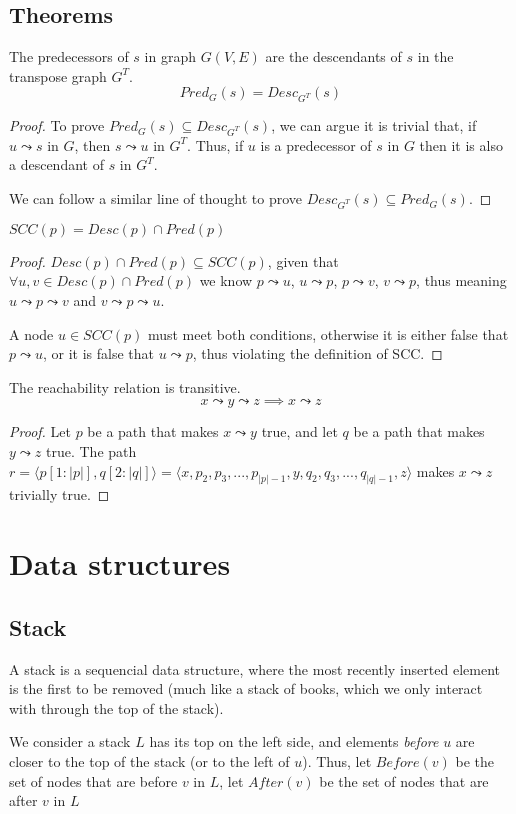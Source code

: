 \subsection{Theorems}
\begin{theorem} \label{theor:pred-desc}
    The predecessors of $s$ in graph $G(V,E)$ are the descendants of $s$ in the transpose graph $G^T$.
    \begin{equation*}
        Pred_{G}(s)=Desc_{G^T}(s)
    \end{equation*}
\end{theorem}
\begin{proof}
    To prove $Pred_G(s) \subseteq Desc_{G^T}(s)$, we can argue it is trivial that, if $u \leadsto s$ in $G$, then $s \leadsto u$ in $G^T$. Thus, if $u$ is a predecessor of $s$ in $G$ then it is also a descendant of $s$ in $G^T$.\par
    We can follow a similar line of thought to prove $Desc_{G^T}(s) \subseteq Pred_G(s)$.
\end{proof}
\begin{theorem} \label{teor:scc}
    $SCC(p)=Desc(p) \cap Pred(p)$
\end{theorem}
\begin{proof}
    $Desc(p) \cap Pred(p) \subseteq SCC(p)$, given that $\forall u, v \in Desc(p) \cap Pred(p)$ we know $p \leadsto u$, $u \leadsto p$, $p \leadsto v$, $v \leadsto p$, thus meaning $u \leadsto p \leadsto v$ and $v \leadsto p \leadsto u$.\par
    A node $u \in SCC(p)$ must meet both conditions, otherwise it is either false that $p \leadsto u$, or it is false that $u \leadsto p$, thus violating the definition of \acrshort{SCC}.
\end{proof}
\begin{theorem}
    The reachability relation is transitive.
    \begin{equation*}
        x \leadsto y \leadsto z \implies x \leadsto z
    \end{equation*}
\end{theorem}
\begin{proof}
Let $p$ be a path that makes $x \leadsto y$ true, and let $q$ be a path that makes $y \leadsto z$ true. The path $r = \langle p[1:|p|], q[2:|q|] \rangle = \langle x, p_2, p_3,...,p_{|p|-1},y,q_2,q_3,...,q_{|q|-1}, z \rangle$ makes $x \leadsto z$ trivially true.
\end{proof}
\section{Data structures}
\subsection{Stack}
A stack is a sequencial data structure, where the most recently inserted element is the first to be removed (much like a stack of books, which we only interact with through the top of the stack).\par
We consider a stack $L$ has its top on the left side, and elements \emph{before} $u$ are closer to the top of the stack (or to the left of $u$). Thus, let $Before(v)$ be the set of nodes that are before $v$ in $L$, let $After(v)$ be the set of nodes that are after $v$ in $L$
